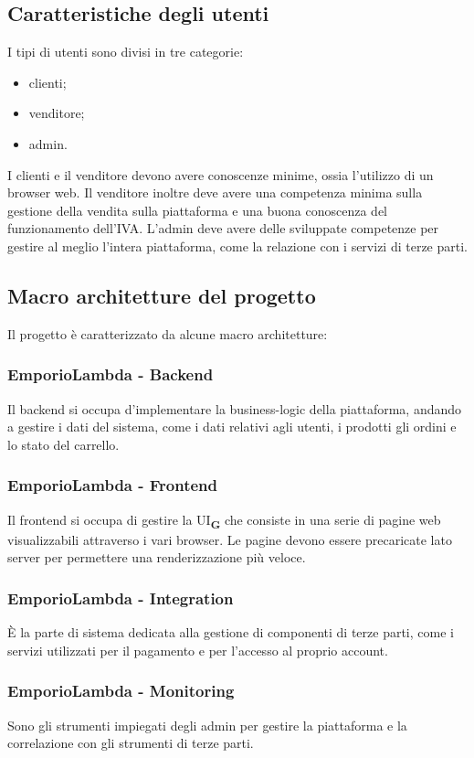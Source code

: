 \subsection{Caratteristiche degli utenti}
I tipi di utenti sono divisi in tre categorie:
\begin{itemize}
    \item clienti;
    \item venditore;
    \item admin.
\end{itemize}
I clienti e il venditore devono avere conoscenze minime, ossia l'utilizzo di un browser web. Il venditore inoltre deve avere una competenza minima sulla gestione della vendita sulla piattaforma e una buona conoscenza del funzionamento dell'IVA. L'admin deve avere delle sviluppate competenze per gestire al meglio l'intera piattaforma, come la relazione con i servizi di terze parti.
\subsection{Macro architetture del progetto}
Il progetto è caratterizzato da alcune macro architetture:
\subsubsection{EmporioLambda - Backend}
Il backend si occupa d'implementare la business-logic della piattaforma, andando a gestire i dati del sistema, come i dati relativi agli utenti, i prodotti gli ordini e lo stato del carrello. 
\subsubsection{EmporioLambda - Frontend}
Il frontend si occupa di gestire la UI\textsubscript{\textbf{G}} che consiste in una serie di pagine web visualizzabili attraverso i vari browser. Le pagine devono essere precaricate lato server per permettere una renderizzazione più veloce.
\subsubsection{EmporioLambda - Integration}
È la parte di sistema dedicata alla gestione di componenti di terze parti, come i servizi utilizzati per il pagamento e per l'accesso al proprio account.
\subsubsection{EmporioLambda - Monitoring}
Sono gli strumenti impiegati degli admin per gestire la piattaforma e la correlazione con gli strumenti di terze parti.






